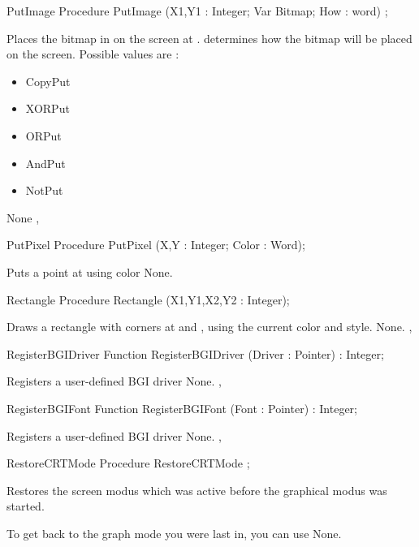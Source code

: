 \begin{procedure}{PutImage}
\Declaration
Procedure PutImage (X1,Y1 : Integer; Var Bitmap; How : word) ;

\Description
{}
Places the bitmap in  on the screen at . 
determines how the bitmap will be placed on the screen. Possible values are :

\begin{itemize}
\item CopyPut
\item XORPut
\item ORPut
\item AndPut
\item NotPut
\end{itemize}
\Errors
None
\SeeAlso
{},
\end{procedure}

\begin{procedure}{PutPixel}
\Declaration
Procedure PutPixel (X,Y : Integer; Color : Word);

\Description
Puts a point at
 using color 
\Errors
None.
\SeeAlso
{}
\end{procedure}

\begin{procedure}{Rectangle}
\Declaration
Procedure Rectangle (X1,Y1,X2,Y2 : Integer);

\Description
Draws a rectangle with
corners at  and , using the current color and
style.
\Errors
None.
\SeeAlso
{}, 
\end{procedure}

\begin{function}{RegisterBGIDriver}
\Declaration
Function RegisterBGIDriver (Driver : Pointer) : Integer;

\Description
Registers a user-defined BGI driver
\Errors
None.
\SeeAlso
{},
\end{function}

\begin{function}{RegisterBGIFont}
\Declaration
Function RegisterBGIFont (Font : Pointer) : Integer;

\Description
Registers a user-defined BGI driver
\Errors
None.
\SeeAlso
{},
\end{function}

\begin{procedure}{RestoreCRTMode}
\Declaration
Procedure RestoreCRTMode ;

\Description
Restores the screen modus which was active before
the graphical modus was started.

To get back to the graph mode you were last in, you can use
\Errors
None.
\SeeAlso
{}
\end{procedure}

